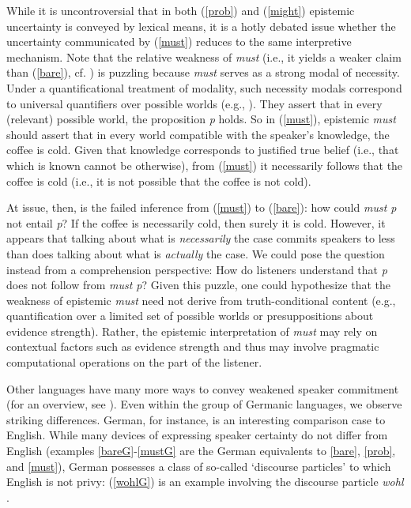 \documentclass[11pt]{article}
\begin{document}
While it is uncontroversial that in both (\ref{prob}) and (\ref{might}) epistemic uncertainty is conveyed by lexical means, it is a hotly debated issue whether the uncertainty communicated by (\ref{must}) reduces to the same interpretive mechanism. Note that the relative weakness of \emph{must} (i.e., it yields a weaker claim than (\ref{bare}), cf. \citealp{karttunen1972}) is puzzling because \emph{must} serves as a strong modal of necessity. Under a quantificational treatment of modality, such necessity modals correspond to universal quantifiers over possible worlds (e.g., \citealp{kratzer1991}). They assert that in every (relevant) possible world, the proposition \emph{p} holds. So in (\ref{must}), epistemic \emph{must} should assert that in every world compatible with the speaker's knowledge, the coffee is cold. Given that knowledge corresponds to justified true belief (i.e., that which is known cannot be otherwise), from (\ref{must}) it necessarily follows that the coffee is cold (i.e., it is not possible that the coffee is not cold).

At issue, then, is the failed inference from (\ref{must}) to (\ref{bare}): how could \emph{must p} not entail \emph{p}? If the coffee is necessarily cold, then surely it is cold. However, it appears that talking about what is \emph{necessarily} the case commits speakers to less than does talking about what is \emph{actually} the case. We could pose the question instead from a comprehension perspective: How do listeners understand that \emph{p} does not follow from \emph{must p}? Given this puzzle, one could hypothesize that the weakness of epistemic \emph{must} need not derive from truth-conditional content (e.g., quantification over a limited set of possible worlds or presuppositions about evidence strength). Rather, the epistemic interpretation of \emph{must} may rely on contextual factors such as evidence strength and thus may involve pragmatic computational operations on the part of the listener.

Other languages have many more ways to convey weakened speaker commitment (for an overview, see \citealp{Aikhenvald2004,Drubig2001,Nuyts2001}). Even within the group of Germanic languages, we observe striking differences. German, for instance, is an interesting comparison case to English. While many devices of expressing speaker certainty do not differ from English (examples \ref{bareG}-\ref{mustG} are the German equivalents to \ref{bare}, \ref{prob}, and \ref{must}), German possesses a class of so-called `discourse particles' to which English is not privy: (\ref{wohlG}) is an example involving the discourse particle \emph{wohl} \citep{Zimmermann2004}. 
\end{document}
